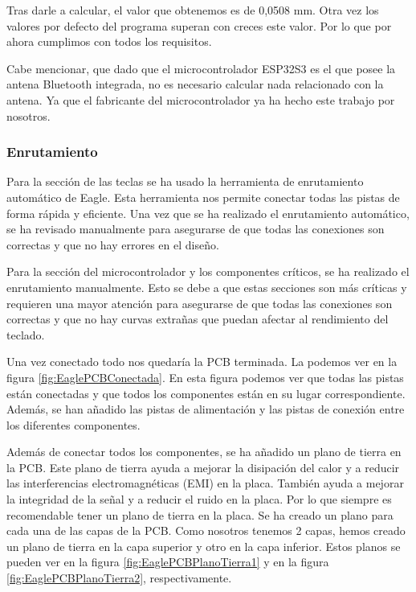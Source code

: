 Tras darle a calcular, el valor que obtenemos es de 0,0508 mm. Otra vez los valores por defecto del programa superan con creces este valor. Por lo que por ahora cumplimos con todos los requisitos.

Cabe mencionar, que dado que el microcontrolador ESP32S3 es el que posee la antena \gls{Bluetooth} integrada, no es necesario calcular nada relacionado con la antena. Ya que el fabricante del microcontrolador ya ha hecho este trabajo por nosotros.

\subsubsection{Enrutamiento}
Para la sección de las teclas se ha usado la herramienta de enrutamiento automático de Eagle. Esta herramienta nos permite conectar todas las pistas de forma rápida y eficiente. Una vez que se ha realizado el enrutamiento automático, se ha revisado manualmente para asegurarse de que todas las conexiones son correctas y que no hay errores en el diseño.

Para la sección del microcontrolador y los componentes críticos, se ha realizado el enrutamiento manualmente. Esto se debe a que estas secciones son más críticas y requieren una mayor atención para asegurarse de que todas las conexiones son correctas y que no hay curvas extrañas que puedan afectar al rendimiento del teclado.

Una vez conectado todo nos quedaría la \gls{PCB} terminada. La podemos ver en la figura \ref{fig:EaglePCBConectada}. En esta figura podemos ver que todas las pistas están conectadas y que todos los componentes están en su lugar correspondiente. Además, se han añadido las pistas de alimentación y las pistas de conexión entre los diferentes componentes.

Además de conectar todos los componentes, se ha añadido un plano de tierra en la \gls{PCB}. Este plano de tierra ayuda a mejorar la disipación del calor y a reducir las interferencias electromagnéticas (EMI) en la placa. También ayuda a mejorar la integridad de la señal y a reducir el ruido en la placa. Por lo que siempre es recomendable tener un plano de tierra en la placa. Se ha creado un plano para cada una de las capas de la \gls{PCB}. Como nosotros tenemos 2 capas, hemos creado un plano de tierra en la capa superior y otro en la capa inferior.
Estos planos se pueden ver en la figura \ref{fig:EaglePCBPlanoTierra1} y en la figura \ref{fig:EaglePCBPlanoTierra2}, respectivamente.


